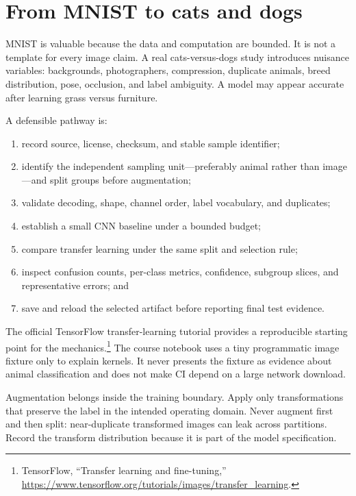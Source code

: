 
\section{From MNIST to cats and dogs}

MNIST is valuable because the data and computation are bounded. It is not a
template for every image claim. A real cats-versus-dogs study introduces
nuisance variables: backgrounds, photographers, compression, duplicate
animals, breed distribution, pose, occlusion, and label ambiguity. A model may
appear accurate after learning grass versus furniture.

A defensible pathway is:

\begin{enumerate}
  \item record source, license, checksum, and stable sample identifier;
  \item identify the independent sampling unit---preferably animal rather than
  image---and split groups before augmentation;
  \item validate decoding, shape, channel order, label vocabulary, and
  duplicates;
  \item establish a small CNN baseline under a bounded budget;
  \item compare transfer learning under the same split and selection rule;
  \item inspect confusion counts, per-class metrics, confidence, subgroup
  slices, and representative errors; and
  \item save and reload the selected artifact before reporting final test
  evidence.
\end{enumerate}

The official TensorFlow transfer-learning tutorial provides a reproducible
starting point for the mechanics.\footnote{TensorFlow, ``Transfer learning and
fine-tuning,''
\url{https://www.tensorflow.org/tutorials/images/transfer_learning}.} The
course notebook uses a tiny programmatic image fixture only to explain kernels.
It never presents the fixture as evidence about animal classification and does
not make CI depend on a large network download.

\begin{professionalbox}
Augmentation belongs inside the training boundary. Apply only transformations
that preserve the label in the intended operating domain. Never augment first
and then split: near-duplicate transformed images can leak across partitions.
Record the transform distribution because it is part of the model specification.
\end{professionalbox}

